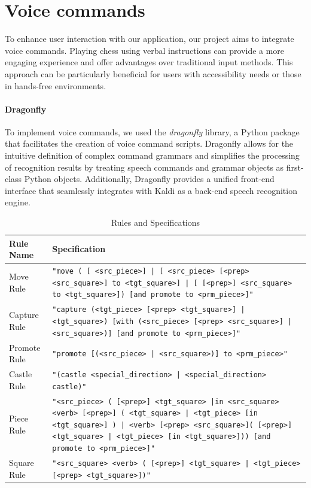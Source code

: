 \documentclass[a4paper, 11pt, twocolumn]{IEEEtran}
\begin{document}
    \section{Voice commands}
    To enhance user interaction with our application, our project aims to integrate voice commands. Playing chess using verbal instructions can provide a more engaging experience and offer advantages over traditional input methods. This approach can be particularly beneficial for users with accessibility needs or those in hands-free environments.
    \paragraph*{Dragonfly} To implement voice commands, we used the \emph{dragonfly} library, a Python package that facilitates the creation of voice command scripts. Dragonfly allows for the intuitive definition of complex command grammars and simplifies the processing of recognition results by treating speech commands and grammar objects as first-class Python objects. Additionally, Dragonfly provides a unified front-end interface that seamlessly integrates with Kaldi as a back-end speech recognition engine.
    
    \begin{table}[h]
        \centering
        \caption{Rules and Specifications}
        \begin{tabularx}{\textwidth}{|l | X|}
            \hline
            \textbf{Rule Name} & \textbf{Specification} \\
            \hline
            Move Rule & \texttt{"move ( [ <src\_piece>] | [ <src\_piece> [<prep> <src\_square>] to <tgt\_square>] | [ [<prep>] <src\_square> to <tgt\_square>]) [and promote to <prm\_piece>]"} \\
            \hline
            Capture Rule & \texttt{"capture (<tgt\_piece> [<prep> <tgt\_square>] | <tgt\_square>) [with (<src\_piece> [<prep> <src\_square>] | <src\_square>)] [and promote to <prm\_piece>]"}\\
            \hline
            Promote Rule & \texttt{"promote [(<src\_piece> | <src\_square>)] to <prm\_piece>"} \\
            \hline 
            Castle Rule & \texttt{"(castle <special\_direction> | <special\_direction> castle)"} \\
            \hline 
            Piece Rule & \texttt{"<src\_piece> ( [<prep>] <tgt\_square> |in <src\_square> <verb> [<prep>] ( <tgt\_square> | <tgt\_piece> [in <tgt\_square>] ) | <verb> [<prep> <src\_square>]( [<prep>] <tgt\_square> | <tgt\_piece>  [in <tgt\_square>])) [and promote to <prm\_piece>]"}\\
            \hline
            Square Rule & \texttt{"<src\_square> <verb> ( [<prep>] <tgt\_square> | <tgt\_piece> [<prep> <tgt\_square>])"}\\
            \hline
        \end{tabularx}
        \label{tab:rules}
    \end{table}
    
\end{document}
